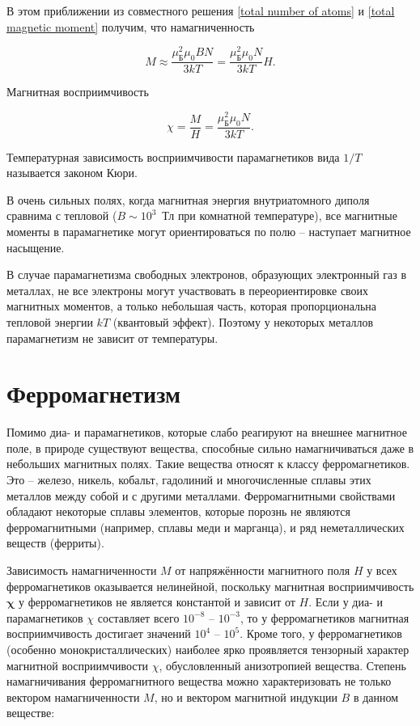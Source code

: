 В этом приближении из совместного решения \eqref{total number of atoms} и \eqref{total magnetic moment} получим, что намагниченность

\begin{equation*}
	M \approx \frac{\mu_{\text{Б}}^2 \mu_0 BN}{3kT} = \frac{\mu_{\text{Б}}^2 \mu_0 N}{3kT} H.
\end{equation*}

Магнитная восприимчивость

\begin{equation*}
	\chi = \frac{M}{H} = \frac{\mu_{\text{Б}}^2 \mu_0 N}{3kT}.
\end{equation*}

Температурная зависимость восприимчивости парамагнетиков вида $1/T$ называется законом Кюри.

В очень сильных полях, когда магнитная энергия внутриатомного диполя сравнима с тепловой ($B \sim 10^3$~Тл при комнатной температуре), все магнитные моменты в парамагнетике могут ориентироваться по полю -- наступает магнитное насыщение.

В случае парамагнетизма свободных электронов, образующих электронный газ в металлах, не все электроны могут участвовать в переориентировке своих магнитных моментов, а только небольшая часть, которая пропорциональна тепловой энергии $kT$ (квантовый эффект). Поэтому у некоторых металлов парамагнетизм не зависит от температуры.

\section{Ферромагнетизм}

Помимо диа- и парамагнетиков, которые слабо реагируют на внешнее магнитное поле, в природе существуют вещества, способные сильно намагничиваться даже в небольших магнитных полях. Такие вещества относят к классу ферромагнетиков. Это -- железо, никель, кобальт, гадолиний и многочисленные сплавы этих металлов между собой и с другими металлами. Ферромагнитными свойствами обладают некоторые сплавы элементов, которые порознь не являются ферромагнитными (например, сплавы меди и марганца), и ряд неметаллических веществ (ферриты).

Зависимость намагниченности $M$ от напряжённости магнитного поля $H$ у всех ферромагнетиков оказывается нелинейной, поскольку магнитная восприимчивость $\mathbf{\chi}$ у ферромагнетиков не является константой и зависит от $H$. Если у диа- и парамагнетиков $\chi$ составляет всего $10^{-8}$ -- $10^{-3}$, то у ферромагнетиков магнитная восприимчивость достигает значений $10^4$ -- $10^5$. Кроме того, у ферромагнетиков (особенно монокристаллических) наиболее ярко проявляется тензорный характер магнитной восприимчивости $\chi$, обусловленный анизотропией вещества. Степень намагничивания ферромагнитного вещества можно характеризовать не только вектором намагниченности $M$, но и вектором магнитной индукции $B$ в данном веществе:

